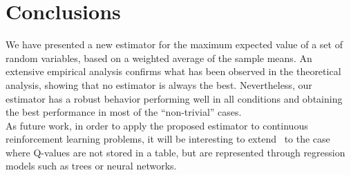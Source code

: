 \section{Conclusions}\label{S:Conclusions}
We have presented a new estimator for the maximum expected value of a set of random variables, based on a weighted average of the sample means. 
An extensive empirical analysis confirms what has been observed in the theoretical analysis, showing that no estimator is always the best. Nevertheless, our estimator has a robust behavior performing well in all conditions and obtaining the best performance in most of the ``non-trivial'' cases.\\
As future work, in order to apply the proposed estimator to continuous reinforcement learning problems, it will be interesting to extend \WE~to the case where Q-values are not stored in a table, but are represented through regression models such as trees or neural networks.